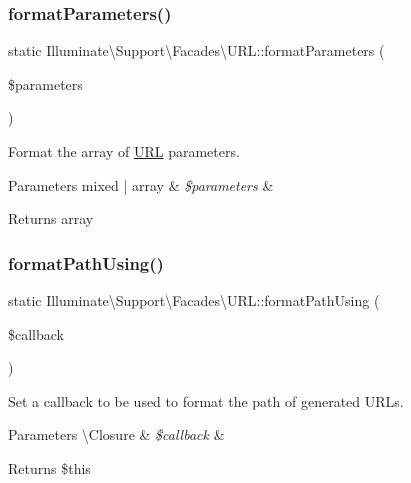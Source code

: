 \subsubsection{\texorpdfstring{format\+Parameters()}{formatParameters()}}
{\footnotesize\ttfamily static Illuminate\textbackslash{}\+Support\textbackslash{}\+Facades\textbackslash{}\+U\+R\+L\+::format\+Parameters (\begin{DoxyParamCaption}\item[{}]{\$parameters }\end{DoxyParamCaption})\hspace{0.3cm}{\ttfamily [static]}}

Format the array of \mbox{\hyperlink{class_illuminate_1_1_support_1_1_facades_1_1_u_r_l}{U\+RL}} parameters.


\begin{DoxyParams}[1]{Parameters}
mixed | array & {\em \$parameters} & \\
\hline
\end{DoxyParams}
\begin{DoxyReturn}{Returns}
array 
\end{DoxyReturn}
\mbox{\label{class_illuminate_1_1_support_1_1_facades_1_1_u_r_l_a6fb4b521f5d25cfa8f2ce8ffc16277f4}} 
\subsubsection{\texorpdfstring{format\+Path\+Using()}{formatPathUsing()}}
{\footnotesize\ttfamily static Illuminate\textbackslash{}\+Support\textbackslash{}\+Facades\textbackslash{}\+U\+R\+L\+::format\+Path\+Using (\begin{DoxyParamCaption}\item[{}]{\$callback }\end{DoxyParamCaption})\hspace{0.3cm}{\ttfamily [static]}}

Set a callback to be used to format the path of generated U\+R\+Ls.


\begin{DoxyParams}[1]{Parameters}
\textbackslash{}\+Closure & {\em \$callback} & \\
\hline
\end{DoxyParams}
\begin{DoxyReturn}{Returns}
\$this 
\end{DoxyReturn}
\mbox{\label{class_illuminate_1_1_support_1_1_facades_1_1_u_r_l_a7ca91f38aa69ace2fe1f0660f090fb5a}} 

